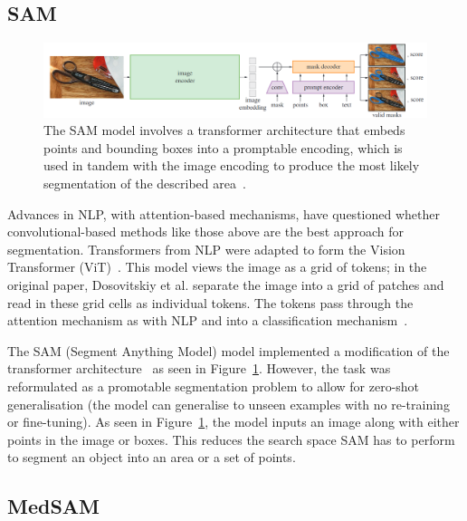 \documentclass[11pt,twoside]{report}
\begin{document}

\subsection{SAM}\label{sect:sam}

\begin{figure}[H]
  \centering
  \includegraphics[width=1\linewidth]{../figures/SAM.png}
  \caption{The SAM model involves a transformer architecture that embeds points and bounding boxes into a promptable encoding, which is used in tandem with the image encoding to produce the most likely segmentation of the described area~\cite{SAM}.}\label{fig:sam}
\end{figure}

Advances in NLP, with attention-based mechanisms, have questioned whether convolutional-based methods like those above are the best approach for segmentation. Transformers from NLP were adapted to form the Vision Transformer (ViT)~\cite{ViT}. This model views the image as a grid of tokens; in the original paper, Dosovitskiy et al. separate the image into a grid of patches and read in these grid cells as individual tokens. The tokens pass through the attention mechanism as with NLP and into a classification mechanism~\cite{ViT}. 

The SAM (Segment Anything Model) model implemented a modification of the transformer architecture~\cite{SAM} as seen in Figure~\ref{fig:sam}. However, the task was reformulated as a promotable segmentation problem to allow for zero-shot generalisation (the model can generalise to unseen examples with no re-training or fine-tuning). As seen in Figure~\ref{fig:sam}, the model inputs an image along with either points in the image or boxes. This reduces the search space SAM has to perform to segment an object into an area or a set of points.

\subsection{MedSAM}\label{sect:medsam}
\end{document}

